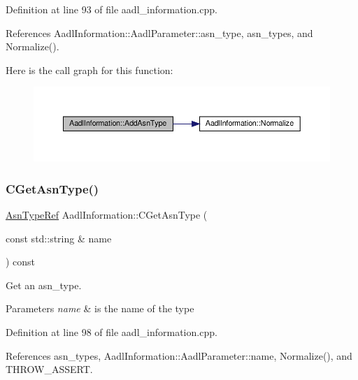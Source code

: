 Definition at line 93 of file aadl\+\_\+information.\+cpp.



References Aadl\+Information\+::\+Aadl\+Parameter\+::asn\+\_\+type, asn\+\_\+types, and Normalize().

Here is the call graph for this function\+:
\nopagebreak
\begin{figure}[H]
\begin{center}
\leavevmode
\includegraphics[width=350pt]{d2/df6/classAadlInformation_a8926df49d647b748f1b6aa30f639b175_cgraph}
\end{center}
\end{figure}
\mbox{\label{classAadlInformation_a0b0282f4f689aa9e7e0d5ed533d9cfde}} 
\subsubsection{\texorpdfstring{C\+Get\+Asn\+Type()}{CGetAsnType()}}
{\footnotesize\ttfamily \hyperlink{asn__type_8hpp_a456d7cf50c15d087cc0428ae80834b35}{Asn\+Type\+Ref} Aadl\+Information\+::\+C\+Get\+Asn\+Type (\begin{DoxyParamCaption}\item[{const std\+::string \&}]{name }\end{DoxyParamCaption}) const}



Get an asn\+\_\+type. 


\begin{DoxyParams}{Parameters}
{\em name} & is the name of the type \\
\hline
\end{DoxyParams}


Definition at line 98 of file aadl\+\_\+information.\+cpp.



References asn\+\_\+types, Aadl\+Information\+::\+Aadl\+Parameter\+::name, Normalize(), and T\+H\+R\+O\+W\+\_\+\+A\+S\+S\+E\+RT.

